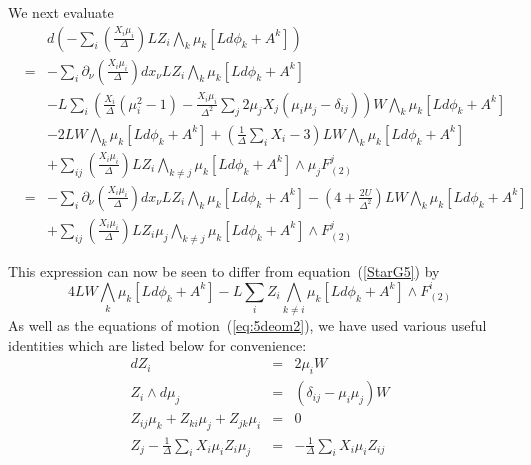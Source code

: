 \documentclass[a4paper,12pt]{article}
\begin{document}
We next evaluate
\begin{eqnarray}
 & & d \left( -\sum_i \left( \frac{X_i \mu_i}{\Delta} \right) L Z_i \bigwedge_k \mu_k [L d \phi_k + A^k]\right) \nonumber \\
 & = & -\sum_i \partial_{\nu} \left( \frac{X_i \mu_i}{\Delta} \right) dx_{\nu} L Z_i \bigwedge_k \mu_k [L d \phi_k + A^k] \nonumber \\
 & & - L \sum_i \left( \frac{X_i}{\Delta}(\mu_i^2 - 1) - \frac{X_i\mu_i}{\Delta^2}\sum_j 2\mu_jX_j(\mu_i\mu_j-\delta_{ij}) \right) W \bigwedge_k \mu_k [L d \phi_k + A^k] \nonumber \\
 & & -2LW \bigwedge_k \mu_k [L d \phi_k + A^k] + \left(\frac{1}{\Delta}\sum_i X_i - 3\right) LW \bigwedge_k \mu_k [L d \phi_k + A^k] \nonumber \\
 & & + \sum_{ij} \left( \frac{X_i \mu_i}{\Delta} \right) LZ_i \bigwedge_{k \ne j} \mu_k [L d \phi_k + A^k] \wedge \mu_jF^j_{(2)} \nonumber \\
 & = & -\sum_i \partial_{\nu} \left( \frac{X_i \mu_i}{\Delta} \right) dx_{\nu} L Z_i \bigwedge_k \mu_k [L d \phi_k + A^k] - \left(4 + \frac{2U}{\Delta^2} \right) L W \bigwedge_k \mu_k [L d \phi_k + A^k] \nonumber \\
 & & + \sum_{ij} \left( \frac{X_i \mu_i}{\Delta} \right) L Z_i \mu_j \bigwedge_{k \ne j} \mu_k [L d \phi_k + A^k] \wedge F^j_{(2)}
\end{eqnarray}

This expression can now be seen to differ from equation~(\ref{StarG5}) by
$$ 4LW\bigwedge_k \mu_k[Ld\phi_k + A^k] -
        L\sum_i Z_i \bigwedge_{k \ne i} \mu_k[Ld\phi_k + A^k] \wedge F^i_{(2)} $$
As well as the equations of motion~(\ref{eq:5deom2}),
we have used various useful identities which are listed below for convenience:
\begin{eqnarray}
dZ_i & = & 2\mu_i W \\
Z_i \wedge d\mu_j & = & (\delta_{ij} - \mu_i\mu_j)W \\
Z_{ij}\mu_k + Z_{ki}\mu_j + Z_{jk}\mu_i & = & 0 \\
Z_j - \frac{1}{\Delta}\sum_i X_i\mu_iZ_i\mu_j & = & -\frac{1}{\Delta}\sum_iX_i\mu_iZ_{ij} \label{Z_Delta}
\end{eqnarray}
\end{document}
